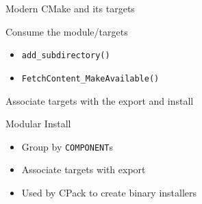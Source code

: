 \documentclass{beamer}
\begin{document}
\begin{frame}[fragile]{Modern CMake and its targets}%
	\vspace{1cm}
	
	
	\begin{block}{\small Consume the module/targets}
		\begin{itemize}\small%
			\item \texttt{add\_subdirectory()}%
			\item \texttt{FetchContent\_MakeAvailable()}%
		\end{itemize}
	\end{block}
\end{frame}

\begin{frame}[fragile]{Associate targets with the export and install}%
	\vspace{1cm}
	
	
	\begin{block}{\small Modular Install}
		\begin{itemize}\small%
			\item Group by \texttt{COMPONENT}s%
			\item Associate targets with export
			\item Used by CPack to create binary installers
		\end{itemize}
	\end{block}
\end{frame}
\end{document}
